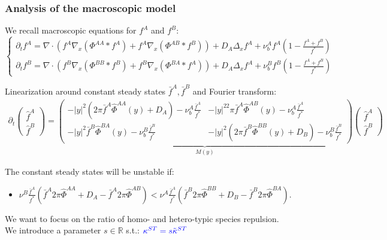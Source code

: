 \documentclass[10pt]{beamer}
\newcommand\ka{\kappa}
\def \p {{\partial}}
\def \bfA {{\bar{f}^A}}
\def \bfB {{\bar{f}^B}}
\def \hPAA {{\hat{\Phi}^{AA}}}
\def \hPBB {{\hat{\Phi}^{BB}}}
\def \hPAB {{\hat{\Phi}^{AB}}}
\def \hPBA {{\hat{\Phi}^{BA}}}
\theoremstyle{remark}
\newcommand\Fontvi{\fontsize{8}{7.2}\selectfont}
\begin{document}
\begin{frame}
\frametitle{Analysis of the macroscopic model}
\Fontvi
We recall macroscopic equations for $f^{A}$ and $f^{B}$:
	\begin{equation}
\begin{cases}
\p_t f^{A}=  \nabla \cdot (f^A\nabla_x(\Phi^{AA}* f^A) + f^A \nabla_x( \Phi^{AB}*f^B)) + D_A \Delta_x f^A + \nu_{b}^{A}f^A\left( 1-\frac{f^A+f^B}{f^{*}} \right) \\

\p_t f^{B}=  \nabla \cdot (f^B\nabla_x(\Phi^{BB}* f^B) + f^B \nabla_x (\Phi^{BA}*f^A)) + D_A \Delta_x f^A + \nu_{b}^{B}f^B\left( 1-\frac{f^A+f^B}{f^{*}} \right)
\end{cases}
\end{equation}

Linearization around constant steady states $\bfA, \bfB$ and Fourier transform:
\begin{align*}
\p_t \begin{pmatrix} \hat{f}^A \\ \hat{f}^B
\end{pmatrix}=
\underbrace{\begin{pmatrix} -|y|^2(2\pi\bfA\hPAA(y)+D_A)-\nu_{b}^A\frac{\bfA}{f^*} & -|y|^22\pi\bfA\hPAB(y)-\nu_{b}^A\frac{\bfA}{f^*} \\ 
-|y|^2\bfB\hPBA(y)-\nu_{b}^B\frac{\bfB}{f^*} & -|y|^2(2\pi\bfB\hPBB(y)+D_B)-\nu_{b}^B\frac{\bfB}{f^*} 
\end{pmatrix}}_{M(y)}
\begin{pmatrix} \hat{f}^A \\ \hat{f}^B
\end{pmatrix}
\end{align*}

The constant steady states will be unstable if:
\begin{itemize}
	\item $ \nu^{B}\frac{\bfA}{f^{*}}( \bfA 2\pi \hPAA+D_A - \bfA 2 \pi \hPAB )<
	\nu^{A} \frac{\bfA}{f^{*}}( \bfB 2 \pi \hPBB + D_B-\bfB 2\pi \hPBA ). $	
\end{itemize}
\vspace{0.3cm}
We want to focus on the ratio of homo- and hetero-typic species repulsion. \\
We introduce a parameter $s\in \mathbb{R}$ s.t.: $\textcolor{blue}{\ka^{ST}=s\tilde{\ka}^{ST}} $





\end{frame}
\end{document}
